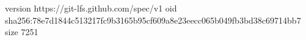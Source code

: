 version https://git-lfs.github.com/spec/v1
oid sha256:78e7d1844c513217fc9b3165b95cf609a8e23eecc065b049fb3bd38c69714bb7
size 7251
